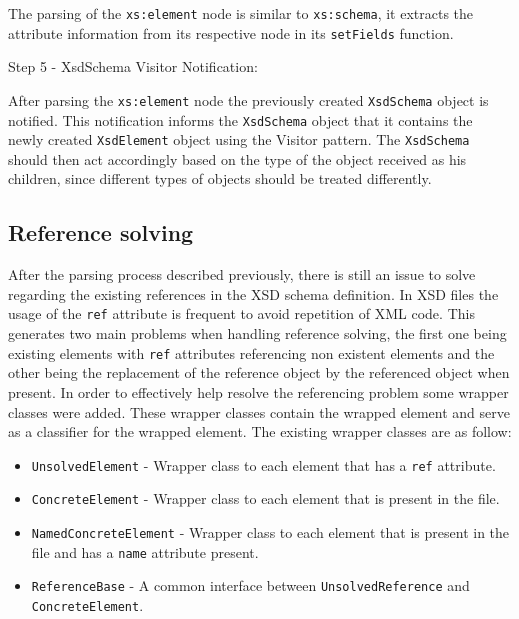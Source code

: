 \noindent
The parsing of the \texttt{xs:element} node is similar to \texttt{xs:schema}, it extracts the attribute information from its respective node in its \texttt{setFields} function. 

Step 5 - XsdSchema Visitor Notification:

\noindent
After parsing the \texttt{xs:element} node the previously created \texttt{XsdSchema} object is notified. This notification informs the \texttt{XsdSchema} object that it contains the newly created \texttt{XsdElement} object using the Visitor pattern. The \texttt{XsdSchema} should then act accordingly based on the type of the object received as his children, since different types of objects should be treated differently.

\subsection{Reference solving}
\label{sec:refsolving}

After the parsing process described previously, there is still an issue to solve regarding the existing references in the \ac{XSD} schema definition. In \ac{XSD} files the usage of the \texttt{ref} attribute is frequent to avoid repetition of \ac{XML} code. This generates two main problems when handling reference solving, the first one being existing elements with \texttt{ref} attributes referencing non existent elements and the other being the replacement of the reference object by the referenced object when present. In order to effectively help resolve the referencing problem some wrapper classes were added. These wrapper classes contain the wrapped element and serve as a classifier for the wrapped element. The existing wrapper classes are as follow:

\begin{itemize}  
	\item \texttt{UnsolvedElement} - Wrapper class to each element that has a \texttt{ref} attribute.
	\item \texttt{ConcreteElement} - Wrapper class to each element that is present in the file.
	\item \texttt{NamedConcreteElement} - Wrapper class to each element that is present in the file and has a \texttt{name} attribute present.
	\item \texttt{ReferenceBase} - A common interface between \texttt{UnsolvedReference} and \texttt{ConcreteElement}.
\end{itemize}

